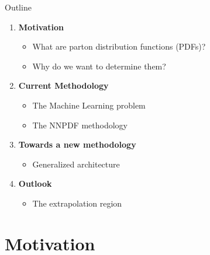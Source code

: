 

\begin{frame}{Outline}

\vspace*{\titleskip}

	\begin{enumerate}
		\item {\textbf{Motivation}}
		\begin{itemize}
			\item What are parton distribution functions (PDFs)?
			\item Why do we want to determine them?
		\end{itemize}
		
		\item {\textbf{Current Methodology}}
		\begin{itemize}
			\item The Machine Learning problem
			\item The NNPDF methodology
		\end{itemize}

		\item {\textbf{Towards a new methodology}}
		\begin{itemize}
			\item Generalized architecture
		\end{itemize}
	
		\item{\textbf{Outlook}}
		\begin{itemize}
		\item The extrapolation region
		\end{itemize}
		
	\end{enumerate}
	
\end{frame}


\section{Motivation}


